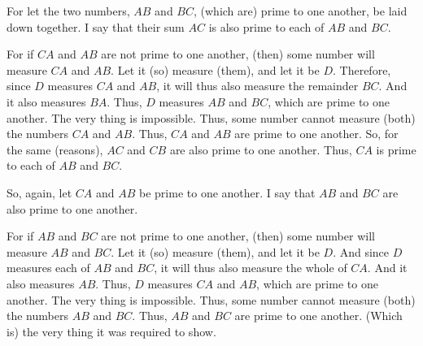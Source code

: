 \begin{Parallel}{}{}
{For let the two numbers, $AB$ and $BC$, (which are) prime to one another,
be laid down together. I say that their sum $AC$ is also prime to each of
$AB$ and $BC$.

For if $CA$ and $AB$ are not prime to one another, (then) some number
will measure $CA$ and $AB$. Let it (so) measure (them), and let it be $D$.
Therefore, since $D$ measures $CA$ and $AB$, it will thus also measure the remainder
$BC$. And it also measures $BA$. Thus, $D$ measures $AB$ and $BC$, which are
prime to one another. The very thing is impossible. Thus, some number cannot measure (both) the numbers $CA$ and $AB$. Thus, $CA$ and $AB$ are prime to
one another. So, for the same (reasons), $AC$ and $CB$ are also prime to one another. Thus, $CA$ is prime to each of $AB$ and $BC$.

So, again, let $CA$ and $AB$  be prime to one another. I say that $AB$ and $BC$
are also prime to one another.

For if $AB$ and $BC$ are not prime to one another, (then) some number will measure $AB$ and $BC$. Let it (so) measure (them), and let it be $D$. And since
$D$ measures each of $AB$ and $BC$, it will thus also measure the whole
of $CA$. And it also measures $AB$. Thus, $D$ measures $CA$ and $AB$, which are
prime to one another. The very thing is impossible. Thus, some number
cannot measure (both) the numbers $AB$ and $BC$. Thus, $AB$ and $BC$ are prime
to one another. (Which is) the very thing it was required to show.}
\end{Parallel}

